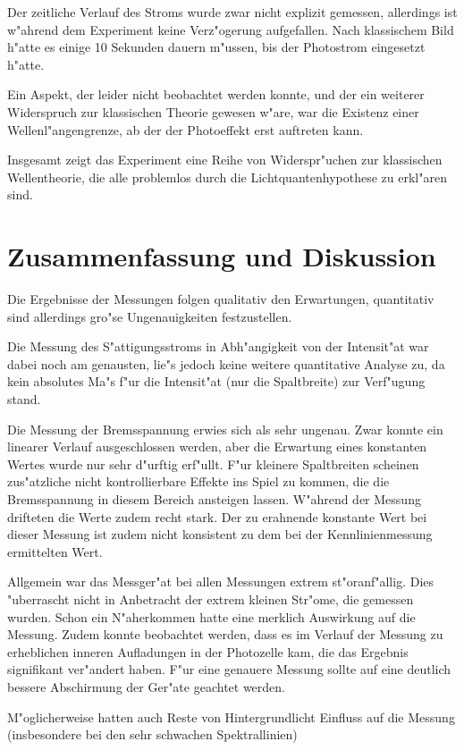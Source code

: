\documentclass[a4paper,10pt]{article}
\begin{document}
    Der zeitliche Verlauf des Stroms wurde zwar nicht explizit gemessen, allerdings ist w"ahrend dem Experiment keine Verz"ogerung aufgefallen. Nach klassischem Bild h"atte es einige 10 Sekunden dauern m"ussen, bis der Photostrom eingesetzt h"atte.

    Ein Aspekt, der leider nicht beobachtet werden konnte, und der ein weiterer Widerspruch zur klassischen Theorie gewesen w"are, war die Existenz einer Wellenl"angengrenze, ab der der Photoeffekt erst auftreten kann.

    Insgesamt zeigt das Experiment eine Reihe von Widerspr"uchen zur klassischen Wellentheorie, die alle problemlos durch die Lichtquantenhypothese zu erkl"aren sind.



\section{Zusammenfassung und Diskussion}
  Die Ergebnisse der Messungen folgen qualitativ den Erwartungen, quantitativ sind allerdings gro"se Ungenauigkeiten festzustellen.

  Die Messung des S"attigungsstroms in Abh"angigkeit von der Intensit"at war dabei noch am genausten, lie"s jedoch keine weitere quantitative Analyse zu, da kein absolutes Ma"s f"ur die Intensit"at (nur die Spaltbreite) zur Verf"ugung stand.

  Die Messung der Bremsspannung erwies sich als sehr ungenau. Zwar konnte ein linearer Verlauf ausgeschlossen werden, aber die Erwartung eines konstanten Wertes wurde nur sehr d"urftig erf"ullt. F"ur kleinere Spaltbreiten scheinen zus"atzliche nicht kontrollierbare Effekte ins Spiel zu kommen, die die Bremsspannung in diesem Bereich ansteigen lassen. W"ahrend der Messung drifteten die Werte zudem recht stark. Der zu erahnende konstante Wert bei dieser Messung ist zudem nicht konsistent zu dem bei der Kennlinienmessung ermittelten Wert.

  Allgemein war das Messger"at bei allen Messungen extrem st"oranf"allig. Dies "uberrascht nicht in Anbetracht der extrem kleinen Str"ome, die gemessen wurden. Schon ein N"aherkommen hatte eine merklich Auswirkung auf die Messung. Zudem konnte beobachtet werden, dass es im Verlauf der Messung zu erheblichen inneren Aufladungen in der Photozelle kam, die das Ergebnis signifikant ver"andert haben.
  F"ur eine genauere Messung sollte auf eine deutlich bessere Abschirmung der Ger"ate geachtet werden.

  M"oglicherweise hatten auch Reste von Hintergrundlicht Einfluss auf die Messung (insbesondere bei den sehr schwachen Spektrallinien)
\end{document}
